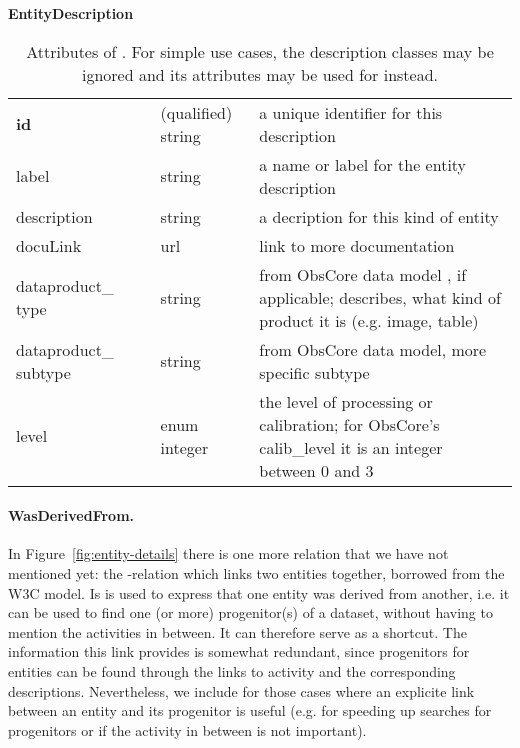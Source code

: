 \begin{table}[h]
\small
{}\textwidth
\textbf{\normalsize EntityDescription}\vspace{0.25em}\\
\begin{tabulary}{\textwidth}{@{}p{2.75cm}p{0cm}p{2cm}L@{}}
\toprule
{} & \head{} &  & \\
\midrule
\textbf{id} & & (qualified) string & a unique identifier for this description\\
label       & & string & a name or label for the entity description\\
description & & string & a decription for this kind of entity\\
docuLink    & & url & link to more documentation\\
dataproduct\_ type  & & string       & from ObsCore data model \citep{std:ObsCore}, if applicable; describes, what kind of product it is (e.g. image, table)\\
dataproduct\_ subtype & & string       & from ObsCore data model, more specific subtype\\
level       & & enum integer & the level of processing or calibration; for ObsCore's calib\_level it is an integer between 0 and 3\\
\bottomrule
\end{tabulary}
\caption{Attributes of . For simple use cases, 
the description classes may be ignored and its attributes may be used for 
 instead. 
}\label{tab:entitydescription-attributes}
\end{table}

\paragraph{WasDerivedFrom.}
In Figure~\ref{fig:entity-details} there is one more relation that we have not mentioned yet: 
the -relation which links two entities together, borrowed from the W3C model. 
Is is used to express that 
one entity was derived from another, i.e. it can be used to find one (or more) progenitor(s) 
of a dataset, without having to mention the activities in between. It can therefore serve as 
a shortcut. The information this link provides is somewhat redundant, since progenitors for entities
can be found through the links to activity and the corresponding descriptions.
Nevertheless, we include  for those cases where an explicite 
link between an entity and its progenitor is useful (e.g. for speeding up searches for 
progenitors or if the activity in between is not important).



